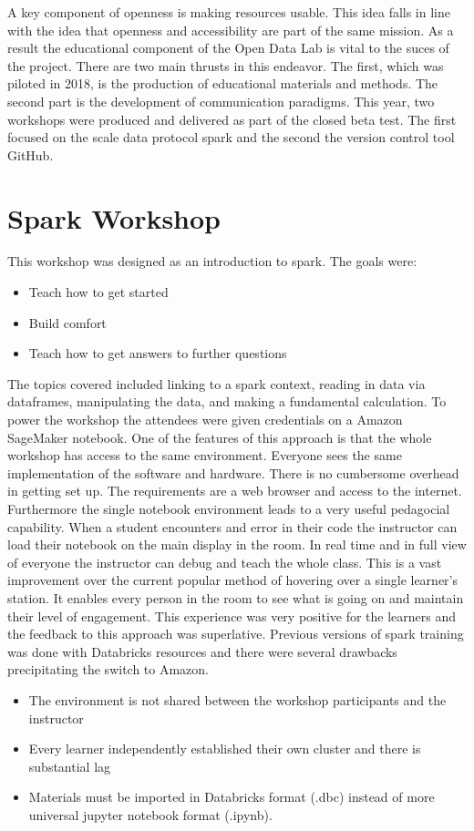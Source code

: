 A key component of openness is making resources usable. This idea falls in line with the idea that openness and accessibility are part of the same mission. As a result the educational component of the Open Data Lab is vital to the suces of the project. There are two main thrusts in this endeavor. The first, which was piloted in 2018, is the production of educational materials and methods. The second part is the development of communication paradigms.
This year, two workshops were produced and delivered as part of the closed beta test. The first focused on the scale data protocol spark and the second the version control tool GitHub.

\section{Spark Workshop}
This workshop was designed as an introduction to spark. The goals were:
\begin{itemize}
\item Teach how to get started
\item Build comfort
\item Teach how to get answers to further questions
\end{itemize}
The topics covered included linking to a spark context, reading in data via dataframes, manipulating the data, and making a fundamental calculation.
To power the workshop the attendees were given credentials on a Amazon SageMaker notebook. One of the features of this approach is that the whole workshop has access to the same environment. Everyone sees the same implementation of the software and hardware. There is no cumbersome overhead in getting set up. The requirements are a web browser and access to the internet.
Furthermore the single notebook environment leads to a very useful pedagocial capability. When a student encounters and error in their code the instructor can load their notebook on the main display in the room. In real time and in full view of everyone the instructor can debug and teach the whole class. This is a vast improvement over the current popular method of hovering over a single learner's station. It enables every person in the room to see what is going on and maintain their level of engagement. This experience was very positive for the learners and the feedback to this approach was superlative.
Previous versions of spark training was done with Databricks resources and there were several drawbacks precipitating the switch to Amazon.
\begin{itemize}
\item The environment is not shared between the workshop participants and the instructor
\item Every learner independently established their own cluster and there is substantial lag
\item Materials must be imported in Databricks format (.dbc) instead of more universal jupyter notebook format (.ipynb).
\end{itemize}

